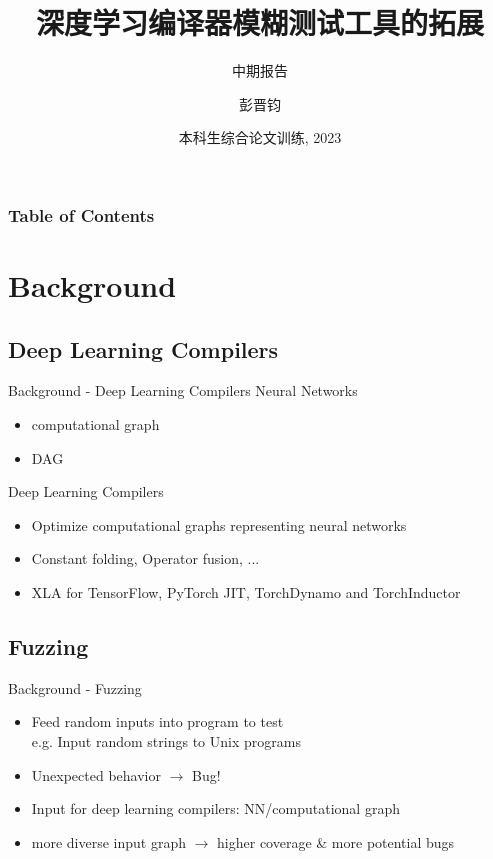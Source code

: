 \documentclass{beamer}
\title[SE x AI] %
{深度学习编译器模糊测试工具的拓展}
\subtitle{中期报告}
\author[] %
{彭晋钧\inst{1}}
\institute[VFU] %
{
  \inst{1}%
  计算机科学与技术系\\
  清华大学\\
  \vspace{1em}
  指导教师：韩文弢\\
  校外指导：Lingming Zhang (UIUC)
}
\date[2023] %
{本科生综合论文训练, 2023}
\begin{document}

\frame{\titlepage}

\begin{frame}
\frametitle{Table of Contents}
\tableofcontents
\end{frame}

\section{Background}

\subsection{Deep Learning Compilers}
\begin{frame}{Background - Deep Learning Compilers}
    Neural Networks
    \begin{itemize}
        \item computational graph
        \item DAG
    \end{itemize}
    Deep Learning Compilers
    \begin{itemize}
        \item Optimize computational graphs representing neural networks
        \item Constant folding, Operator fusion, ...
        \item XLA for TensorFlow, PyTorch JIT, TorchDynamo and TorchInductor
    \end{itemize}
\end{frame}

\subsection{Fuzzing}
\begin{frame}{Background - Fuzzing}
    \begin{itemize}
        \item Feed random inputs into program to test\\
        e.g. Input random strings to Unix programs
        \item Unexpected behavior $\rightarrow$ Bug!
        \item Input for deep learning compilers: NN/computational graph
        \item more diverse input graph $\rightarrow$ higher coverage \& more potential bugs
    \end{itemize}
\end{frame}
\end{document}
